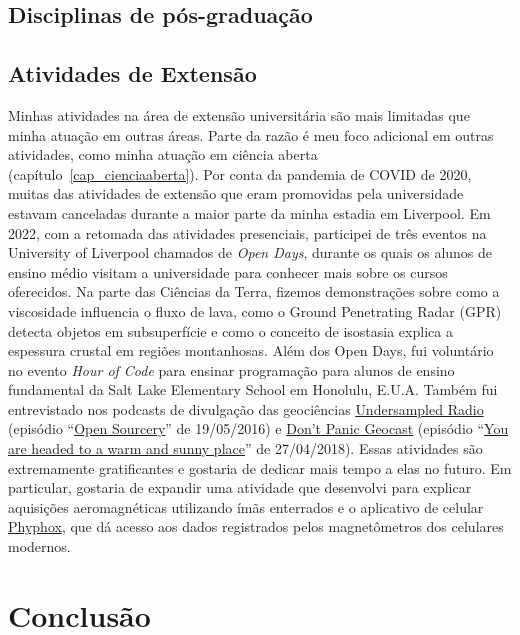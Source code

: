 \documentclass[12pt,a4paper,oneside]{book}
\newcommand{\UoL}{University of Liverpool}
\begin{document}
\section{Disciplinas de pós-graduação}
\label{sec_ensino_pos}


\section{Atividades de Extensão}

Minhas atividades na área de extensão universitária são mais limitadas que
minha atuação em outras áreas.
Parte da razão é meu foco adicional em outras atividades, como minha atuação
em ciência aberta (capítulo~\ref{cap_cienciaaberta}).
Por conta da pandemia de COVID de 2020, muitas das atividades de extensão que
eram promovidas pela universidade estavam canceladas durante a maior parte da
minha estadia em Liverpool.
Em 2022, com a retomada das atividades presenciais, participei de três eventos
na \UoL{} chamados de \textit{Open Days}, durante os quais
os alunos de ensino médio visitam a universidade para conhecer mais sobre os
cursos oferecidos.
Na parte das Ciências da Terra, fizemos demonstrações sobre como a viscosidade
influencia o fluxo de lava, como o Ground Penetrating Radar (GPR) detecta
objetos em subsuperfície e como o conceito de isostasia explica a espessura
crustal em regiões montanhosas.
Além dos Open Days, fui voluntário no evento \textit{Hour of Code} para ensinar
programação para alunos de ensino fundamental da Salt Lake Elementary School em
Honolulu, E.U.A.
Também fui entrevistado nos podcasts de divulgação das geociências
\href{https://undersampledrad.io}{Undersampled Radio}
(episódio ``\href{https://undersampledrad.io/home/2016/7/open-sourcery}{Open
Sourcery}'' de 19/05/2016)
e \href{https://www.dontpanicgeocast.com/166}{Don't Panic Geocast}
(episódio ``\href{https://www.dontpanicgeocast.com/166}{You are headed to a warm and sunny place}''
de 27/04/2018).
Essas atividades são extremamente gratificantes e gostaria de dedicar mais
tempo a elas no futuro.
Em particular, gostaria de expandir uma atividade que desenvolvi para explicar
aquisições aeromagnéticas utilizando ímãs enterrados e o aplicativo de celular
\href{https://phyphox.org/}{Phyphox}, que dá acesso aos dados registrados pelos
magnetômetros dos celulares modernos.


\chapter{Conclusão}
\label{cap_conclusao}
\end{document}
